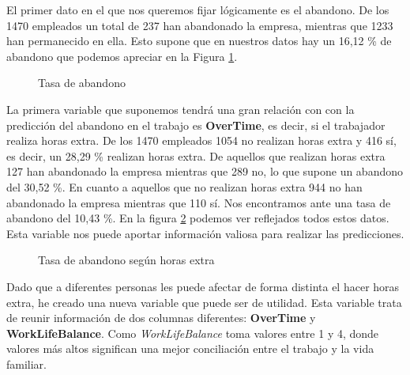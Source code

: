 El primer dato en el que nos queremos fijar lógicamente es el abandono. De los 1470 empleados un total de 237 han abandonado la empresa, mientras que 1233 han permanecido en ella.
Esto supone que en nuestros datos hay un 16,12 \% de abandono que podemos apreciar en la Figura \ref{fig:attrition}.\\

\begin{figure}
\centering
{}
\caption{Tasa de abandono}
\label{fig:attrition}
\end{figure}


La primera variable que suponemos tendrá una gran relación con con la predicción del abandono en el trabajo es \textbf{OverTime}, es decir, si el trabajador realiza horas extra.
De los 1470 empleados 1054 no realizan horas extra y 416 sí, es decir, un 28,29 \% realizan horas extra.
De aquellos que realizan horas extra 127 han abandonado la empresa mientras que 289 no, lo que supone un abandono del 30,52 \%.
En cuanto a aquellos que no realizan horas extra 944 no han abandonado la empresa mientras que 110 sí. Nos encontramos ante una tasa de abandono del 10,43 \%. En la figura \ref{fig:attrition_overtime} podemos ver reflejados todos estos datos.\\

Esta variable nos puede aportar información valiosa para realizar las predicciones.\\

\begin{figure}
\centering
{}
\qquad
{}
\caption{Tasa de abandono según horas extra}
\label{fig:attrition_overtime}
\end{figure}

Dado que a diferentes personas les puede afectar de forma distinta el hacer horas extra, he creado una nueva variable que puede ser de utilidad.
Esta variable trata de reunir información de dos columnas diferentes: \textbf{OverTime} y \textbf{WorkLifeBalance}. 
Como \textit{WorkLifeBalance} toma valores entre 1 y 4, donde valores más altos significan una mejor conciliación entre el trabajo y la vida familiar.\\

